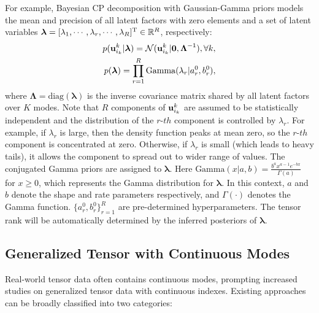 For example, Bayesian CP decomposition with  Gaussian-Gamma priors models the mean and precision of all latent factors with  zero elements and a set of latent variables $\boldsymbol{\lambda}=[\lambda_1, \cdots, \lambda_r, \cdots, \lambda_R]^{\mathrm{T}} \in \mathbb{R}^{R}$, respectively:  
\begin{align}
        p(\mathbf{u}_{i_k}^{k}|\boldsymbol{\lambda}) = \mathcal{N}(\mathbf{u}_{i_k}^{k}|\boldsymbol{0}, \boldsymbol{\Lambda}^{-1}), \forall k,\label{eq:u}\\
    p(\boldsymbol{\lambda}) = \prod_{r=1}^{R} \text{Gamma}(\lambda_r|a_r^0, b_r^0),
    \label{eq:lambda}
\end{align}
where $\boldsymbol{\Lambda} = \text{diag}(\boldsymbol{\lambda})$ is the inverse covariance matrix  shared by all latent factors  over  $K$ modes.   Note that $R$ components of $\mathbf{u}_{i_k}^{k}$ are assumed to be statistically independent and the distribution of the $r$-$th$ component is controlled by $\lambda_r$. For example, if $\lambda_r$ is large, then the density function peaks at mean zero, so the $r$-$th$ component is concentrated at zero. Otherwise, if $\lambda_r$ is small (which leads to heavy tails), it allows the component to spread out to wider range of values. The conjugated Gamma priors are assigned to $\boldsymbol{\lambda}$. Here $\text{Gamma}(x|a,b)=\frac{b^ax^{a-1}e^{-bx}}{\Gamma(a)}$ for $x \ge 0$, which represents the Gamma distribution for $\boldsymbol{\lambda}$. In this context, $a$ and $b$ denote the shape and rate parameters respectively, and $\Gamma(\cdot)$ denotes the Gamma function. $\{a_r^0, b_r^0\}_{r=1}^R$ are pre-determined hyperparameters. 
The tensor rank will be automatically determined by the inferred posteriors of $\boldsymbol{\lambda}$.

\subsection{Generalized Tensor with Continuous Modes}
Real-world tensor data often contains continuous modes, prompting increased studies on generalized tensor data with continuous indexes. Existing approaches can be broadly classified into two categories:




